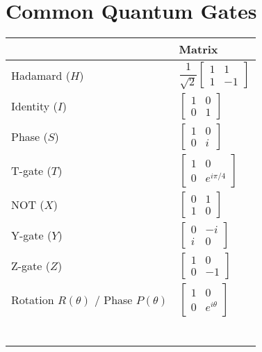 \documentclass[12pt]{article}
\theoremstyle{definition}
\theoremstyle{remark}
\begin{document}
\section{Common Quantum Gates}

\begin{table}[h!]
\centering
\renewcommand{\arraystretch}{1.6}
\begin{tabularx}{\textwidth}{X X}
\begin{tabular}{cl}
\toprule
\textbf{Gate} & \textbf{Matrix} \\
\midrule
Hadamard ($H$) &
$\dfrac{1}{\sqrt{2}} \begin{bmatrix}
1 & 1 \\
1 & -1
\end{bmatrix}$ \\
Identity ($I$) &
$\begin{bmatrix}
1 & 0 \\
0 & 1
\end{bmatrix}$ \\
Phase ($S$) &
$\begin{bmatrix}
1 & 0 \\
0 & i
\end{bmatrix}$ \\
T-gate ($T$) &
$\begin{bmatrix}
1 & 0 \\
0 & e^{i\pi/4}
\end{bmatrix}$ \\
NOT ($X$) &
$\begin{bmatrix}
0 & 1 \\
1 & 0
\end{bmatrix}$ \\
Y-gate ($Y$) &
$\begin{bmatrix}
0 & -i \\
i & 0
\end{bmatrix}$ \\
Z-gate ($Z$) &
$\begin{bmatrix}
1 & 0 \\
0 & -1
\end{bmatrix}$ \\
Rotation $R(\theta)$ / Phase $P(\theta)$ &
$\begin{bmatrix}
1 & 0 \\
0 & e^{i\theta}
\end{bmatrix}$ \\
\bottomrule
\end{tabular}
&
\begin{tabular}{cl}

\end{tabular}
\end{tabularx}
\end{table}
\end{document}
